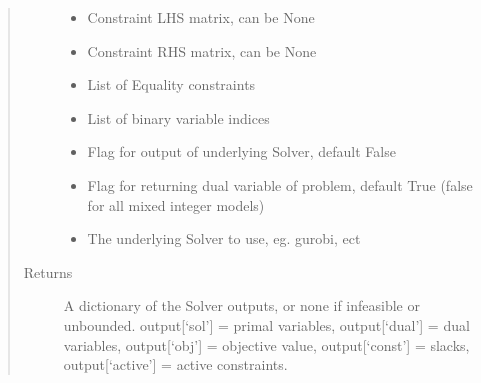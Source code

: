 \documentclass[letterpaper,10pt,english]{sphinxmanual}
\begin{document}
\begin{fulllineitems}
\begin{quote}
\begin{description}
\begin{itemize}
\item {} 
\sphinxAtStartPar
{} \textendash{} Constraint LHS matrix, can be None

\item {} 
\sphinxAtStartPar
{} \textendash{} Constraint RHS matrix, can be None

\item {} 
\sphinxAtStartPar
{} \textendash{} List of Equality constraints

\item {} 
\sphinxAtStartPar
{} \textendash{} List of binary variable indices

\item {} 
\sphinxAtStartPar
{} \textendash{} Flag for output of underlying Solver, default False

\item {} 
\sphinxAtStartPar
{} \textendash{} Flag for returning dual variable of problem, default True (false for all mixed integer models)

\item {} 
\sphinxAtStartPar
{} \textendash{} The underlying Solver to use, eg. gurobi, ect

\end{itemize}

\item[{Returns}] \leavevmode
\sphinxAtStartPar
A dictionary of the Solver outputs, or none if infeasible or unbounded. output{[}‘sol’{]} = primal variables, output{[}‘dual’{]} = dual variables, output{[}‘obj’{]} = objective value, output{[}‘const’{]} = slacks, output{[}‘active’{]} = active constraints.

\end{description}\end{quote}

\end{fulllineitems}

\end{document}
